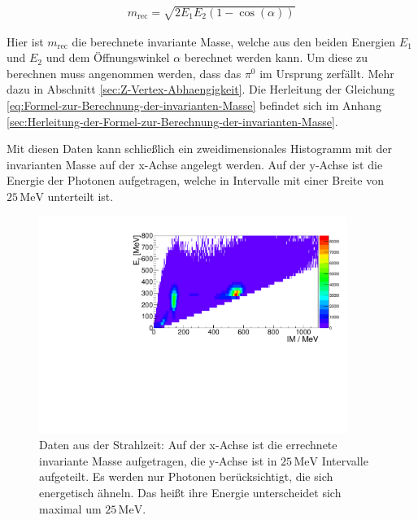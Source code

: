 \documentclass[a4paper,11pt,oneside,final,german,openbib,pdftex]{scrbook}
\begin{document}
{ \begin{equation}
 \begin{split}
 {m_{\text{rec}}=\sqrt{2E_1E_2(1-\cos(\alpha))}}
 \label{eq:Formel-zur-Berechnung-der-invarianten-Masse}
 \end{split}
 \end{equation}

Hier ist $m_{\text{rec}}$ die berechnete invariante Masse, welche aus den beiden Energien $E_1$ und $E_2$ und dem \"Offnungswinkel $\alpha$ berechnet werden kann. Um diese zu berechnen muss angenommen werden, dass das $\pi^0$ im Ursprung zerf\"allt. Mehr dazu in Abschnitt \ref{sec:Z-Vertex-Abhaengigkeit}.
Die Herleitung der Gleichung \ref{eq:Formel-zur-Berechnung-der-invarianten-Masse} befindet sich im Anhang \ref{sec:Herleitung-der-Formel-zur-Berechnung-der-invarianten-Masse}.

Mit diesen Daten kann schließlich ein zweidimensionales Histogramm mit der invarianten Masse auf der x-Achse angelegt werden. Auf der y-Achse ist die Energie der Photonen aufgetragen, welche in Intervalle mit einer Breite von $25 \,\text{MeV}$ unterteilt ist. 


\begin{figure}[h!]
	\begin{center}
		\includegraphics[width=100mm]{NewCalib/Strahlzeit2014/20171904Uncharged2DHist}
	
		\caption[Strahlzeit: 2D-Histogramm; Keine weiteren Bedingungen]{Daten aus der Strahlzeit: Auf der x-Achse ist die errechnete invariante Masse aufgetragen, die y-Achse ist in $25 \,\text{MeV}$ Intervalle aufgeteilt. Es werden nur Photonen ber\"ucksichtigt, die sich energetisch ähneln. Das hei{\ss}t ihre Energie unterscheidet sich maximal um $25 \,\text{MeV}$.}
			\label{fig:Energy-Interval-Hist-All-Bins}
	\end{center}
\end{figure}

}
\end{document}
